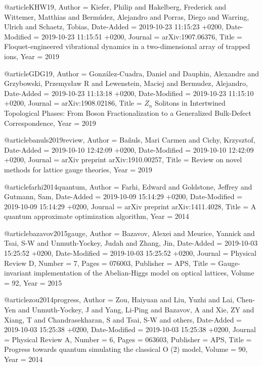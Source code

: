 \documentclass[epj,final]{svjour}
\begin{document}
@article{KHW19,
	Author = {Kiefer, Philip and Hakelberg, Frederick and Wittemer, Matthias and Berm{\'u}dez, Alejandro and Porras, Diego and Warring, Ulrich and Schaetz, Tobias},
	Date-Added = {2019-10-23 11:15:23 +0200},
	Date-Modified = {2019-10-23 11:15:51 +0200},
	Journal = {arXiv:1907.06376},
	Title = {Floquet-engineered vibrational dynamics in a two-dimensional array of trapped ions},
	Year = {2019}}

@article{GDG19,
	Author = {Gonz{\'a}lez-Cuadra, Daniel and Dauphin, Alexandre and Grzybowski, Przemys{\l}aw R and Lewenstein, Maciej and Bermudez, Alejandro},
	Date-Added = {2019-10-23 11:13:18 +0200},
	Date-Modified = {2019-10-23 11:15:10 +0200},
	Journal = {arXiv:1908.02186},
	Title = {{$Z_n$} Solitons in Intertwined Topological Phases: From Boson Fractionalization to a Generalized Bulk-Defect Correspondence},
	Year = {2019}}

@article{banuls2019review,
	Author = {Ba{\~n}uls, Mari Carmen and Cichy, Krzysztof},
	Date-Added = {2019-10-10 12:42:09 +0200},
	Date-Modified = {2019-10-10 12:42:09 +0200},
	Journal = {arXiv preprint arXiv:1910.00257},
	Title = {Review on novel methods for lattice gauge theories},
	Year = {2019}}

@article{farhi2014quantum,
	Author = {Farhi, Edward and Goldstone, Jeffrey and Gutmann, Sam},
	Date-Added = {2019-10-09 15:14:29 +0200},
	Date-Modified = {2019-10-09 15:14:29 +0200},
	Journal = {arXiv preprint arXiv:1411.4028},
	Title = {A quantum approximate optimization algorithm},
	Year = {2014}}

@article{bazavov2015gauge,
	Author = {Bazavov, Alexei and Meurice, Yannick and Tsai, S-W and Unmuth-Yockey, Judah and Zhang, Jin},
	Date-Added = {2019-10-03 15:25:52 +0200},
	Date-Modified = {2019-10-03 15:25:52 +0200},
	Journal = {Physical Review D},
	Number = {7},
	Pages = {076003},
	Publisher = {APS},
	Title = {Gauge-invariant implementation of the Abelian-Higgs model on optical lattices},
	Volume = {92},
	Year = {2015}}

@article{zou2014progress,
	Author = {Zou, Haiyuan and Liu, Yuzhi and Lai, Chen-Yen and Unmuth-Yockey, J and Yang, Li-Ping and Bazavov, A and Xie, ZY and Xiang, T and Chandrasekharan, S and Tsai, S-W and others},
	Date-Added = {2019-10-03 15:25:38 +0200},
	Date-Modified = {2019-10-03 15:25:38 +0200},
	Journal = {Physical Review A},
	Number = {6},
	Pages = {063603},
	Publisher = {APS},
	Title = {Progress towards quantum simulating the classical O (2) model},
	Volume = {90},
	Year = {2014}}
\end{document}
